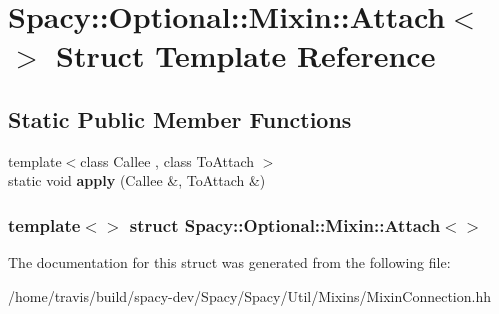 \hypertarget{structSpacy_1_1Optional_1_1Mixin_1_1Attach_3_4}{\section{\-Spacy\-:\-:\-Optional\-:\-:\-Mixin\-:\-:\-Attach$<$$>$ \-Struct \-Template \-Reference}
\label{structSpacy_1_1Optional_1_1Mixin_1_1Attach_3_4}
}
\subsection*{\-Static \-Public \-Member \-Functions}
\begin{DoxyCompactItemize}
\item 
\hypertarget{structSpacy_1_1Optional_1_1Mixin_1_1Attach_3_4_ae78568d36f4b9ee4ece2c501880fc894}{{\footnotesize template$<$class Callee , class To\-Attach $>$ }\\static void {\bfseries apply} (\-Callee \&, \-To\-Attach \&)}\label{structSpacy_1_1Optional_1_1Mixin_1_1Attach_3_4_ae78568d36f4b9ee4ece2c501880fc894}

\end{DoxyCompactItemize}
\subsubsection*{template$<$$>$ struct Spacy\-::\-Optional\-::\-Mixin\-::\-Attach$<$$>$}



\-The documentation for this struct was generated from the following file\-:\begin{DoxyCompactItemize}
\item 
/home/travis/build/spacy-\/dev/\-Spacy/\-Spacy/\-Util/\-Mixins/\-Mixin\-Connection.\-hh\end{DoxyCompactItemize}
